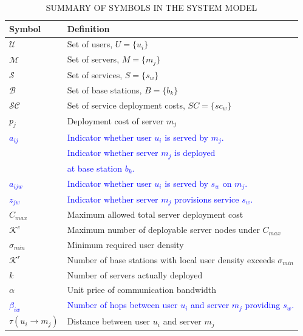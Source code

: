 \documentclass[10pt, conference, letterpaper]{IEEEtran}
\newcommand{\rev}[1]{\textcolor{blue}{#1}}
\newcommand{\rev}[1]{#1}
\begin{document}
\begin{table}[!t]
\centering
\caption{SUMMARY OF SYMBOLS IN THE SYSTEM MODEL}
\label{table:variables_extended}
\begin{tabular}{|>{\centering\arraybackslash}m{2cm}|>{\raggedright\arraybackslash}m{6cm}|}
    \hline
    \textbf{Symbol} & \textbf{Definition} \\
    \hline
    $\mathcal{U}$ & Set of users, $U = \{u_i\}$ \\ \hline
    $\mathcal{M}$ & Set of servers, $M = \{m_j\}$ \\ \hline
    $\mathcal{S}$ & Set of services, $S = \{s_w\}$ \\ \hline
    $\mathcal{B}$ & Set of base stations, $B = \{b_k\}$ \\ \hline
    $\mathcal{SC}$ & Set of service deployment costs, $SC = \{sc_w\}$ \\ \hline
    $p_j$ & Deployment cost of server $m_j$ \\ \hline
    \rev{$a_{ij}$} & \rev{Indicator whether user $u_i$ is served by $m_j$.}\\ \hline
    \multirow{2}{*}{\rev{$y_{jk}$}} & \rev{Indicator whether server $m_j$ is deployed} \\ 
    & \rev{at base station $b_k$.}\\ \hline
    \rev{$a_{ijw}$} & \rev{Indicator whether user $u_i$ is served by $s_w$ on $m_j$.} \\ \hline
    \rev{$z_{jw}$} & \rev{Indicator whether server $m_j$ provisions service $s_w$.} \\ \hline
    $C_{max}$ & Maximum allowed total server deployment cost \\ \hline
    $\mathcal{K}^c$ & Maximum number of deployable server nodes under $C_{max}$ \\ \hline
    $\sigma_{min}$ & Minimum required user density \\ \hline
   $\mathcal{K}^r$ & Number of base stations with local user density exceeds $\sigma_{min}$ \\ \hline
    $k$ & Number of servers actually deployed \\ \hline
    $\alpha$ & Unit price of communication bandwidth \\ \hline
    \rev{$\beta_{iw}$} & \rev{Number of hops between user $u_i$ and server $m_j$ providing $s_w$.} \\ \hline
    $\tau(u_i \rightarrow m_j)$ & Distance between user $u_i$ and server $m_j$ \\ \hline

\end{tabular}
\end{table}
\end{document}
